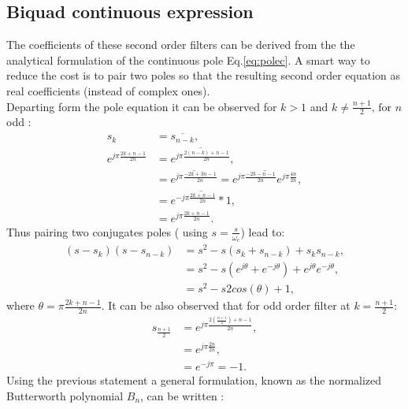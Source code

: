 \documentclass[twoside,twocolumn]{article}
\begin{document}
\subsection{Biquad continuous expression}
The coefficients of these second order filters can be derived from the the analytical formulation of the continuous pole Eq.\ref{eq:polec}. A smart way to reduce the cost is to pair two poles so that the resulting second order equation as real coefficients (instead of complex ones). \\
Departing form the pole equation it can be observed for $k>1$ and $k \neq \frac{n+1}{2} \text{, for } n $ odd :
\begin{equation}
\begin{split}
s_{k} &=\overline{s_{n-k}},\\
e^{j\pi\frac{2k+n-1}{2n}} &=\overline{ e^{j\pi\frac{2(n-k)+n-1}{2n}}},\\
		&=\overline {e^{j\pi\frac{-2k+3n-1}{2n}}}=\overline {e^{j\pi\frac{-2k-n-1}{2n}}e^{j\pi\frac{4n}{2n}}},\\
		&= \overline{ e^{-j\pi\frac{2k+n-1}{2n}}*1},\\
		&=e^{j\pi\frac{2k+n-1}{2n}}.
\end{split}
\end{equation}
Thus pairing two conjugates poles ( using $s=\frac{s}{\omega_c}$) lead to:
\begin{equation}
	\begin{split}
		{(s-s_k)(s-s_{n-k})}&={s^2-s(s_k+s_{n-k})+s_ks_{n-k}},\\
		&= {s^2-s(e^{j\theta}+e^{-j\theta})+e^{j\theta}e^{-j\theta}},\\
		&= {s^2-s2cos(\theta)+1},
	\end{split}
\end{equation}
where $\theta=\pi\frac{2k+n-1}{2n}$.
It can be also observed that for odd order filter at $k=\frac{n+1}{2}$:
\begin{equation}
\begin{split}
s_{\frac{n+1}{2}}&=e^{j\pi\frac{2(\frac{n+1}{2})+n-1}{2n}},\\
 &=e^{j\pi\frac{2n}{2n}},\\
 &=e^{-j\pi}=-1.
\end{split}
\end{equation}
Using the previous statement a general formulation, known as  the normalized Butterworth polynomial $B_n$, can be written :
\end{document}

